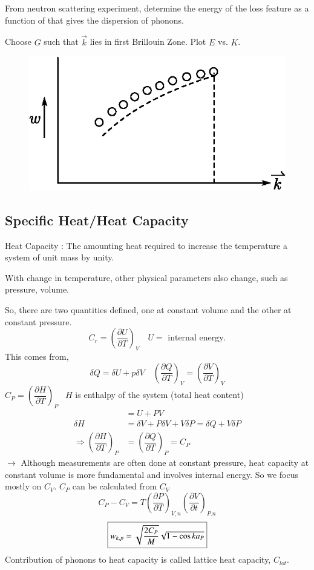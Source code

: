 \chapter[Lecture 19]{}\label{lec19}

From neutron scattering experiment, determine the energy of the loss feature as a function of  that gives the dispersion of phonons.

Choose $G$ such that $\overrightarrow{k}$ lies in first Brillouin Zone. Plot $E$ vs. $K$.
\begin{figure}[H]
\centering
\includegraphics{images/lecture19/fig1a.eps}
\end{figure}

\section*{Specific Heat/Heat Capacity}

Heat Capacity : The amounting heat required to increase the temperature a system of unit mass by unity.

With change in temperature, other physical parameters also change, such as pressure, volume.

So, there are two quantities defined, one at constant volume and the other at constant pressure.
$$
C_{r}=\left(\dfrac{\partial U}{\partial T}\right)_{V}\quad U=\text{ internal energy.}
$$
This comes from,
$$
\delta Q=\delta U + p\delta V\quad \left(\dfrac{\partial Q}{\partial T}\right)_{V}=\left(\dfrac{\partial V}{\partial T}\right)_{V}
$$
$C_{P}=\left(\dfrac{\partial H}{\partial T}\right)_{P}$ \ $H$ is enthalpy of the system (total heat content)
\begin{align*}
&= U+PV\\
\delta H &= \delta V+P\delta V+V\delta P=\delta Q+V\delta P\\
\Rightarrow \left(\dfrac{\partial H}{\partial T}\right)_{P} &= \left(\dfrac{\partial Q}{\partial T}\right)_{P}=C_{P}
\end{align*}
$\to$ Although measurements are often done at constant pressure, heat capacity at constant volume is more fundamental and involves internal energy. So we focus mostly on $C_{V}$. $C_{P}$ can be calculated from $C_{V}$
$$
C_{P}-C_{V}=T\left(\dfrac{\partial P}{\partial T}\right)_{V,n}\left(\dfrac{\partial V}{\partial t}\right)_{P.n}
$$
$$
\fbox{$w_{k,p}=\sqrt{\dfrac{2C_{P}}{M}}\sqrt{1-\cos ka_{P}}$}
$$
Contribution of phonons to heat capacity is called lattice heat capacity, $C_{lot}$.

